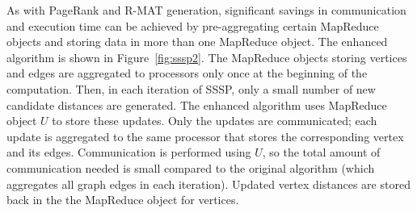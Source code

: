 As with PageRank and R-MAT generation, 
significant savings in communication and execution time
can be achieved by pre-aggregating certain MapReduce objects and 
storing data in more than one MapReduce object.  The enhanced algorithm
is shown in Figure~\ref{fig:sssp2}.  The MapReduce objects storing
vertices and edges are aggregated to processors only once at the beginning
of the computation.  Then, in each iteration of 
SSSP, only a small number of new candidate distances are generated.
The enhanced algorithm uses MapReduce object $U$ to store these updates.
Only the updates are communicated; each update is aggregated to the 
same processor that stores the corresponding vertex and its edges.
Communication is performed using $U$, so the total amount of communication
needed is small compared to the original algorithm (which aggregates all
graph edges in each iteration).  Updated vertex distances are stored back
in the the MapReduce object for vertices.

